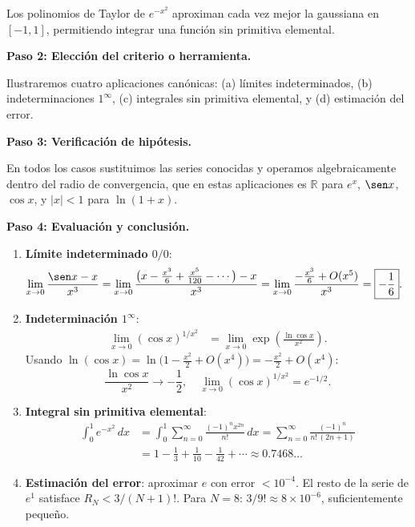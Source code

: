 \begin{example}
\begin{myproof}
Los polinomios de Taylor de $e^{-x^2}$ aproximan cada vez mejor la
gaussiana en $[-1,1]$, permitiendo integrar una función sin primitiva
elemental.

\textbf{Paso 2: Elección del criterio o herramienta.}

Ilustraremos cuatro aplicaciones canónicas: (a) límites
indeterminados, (b) indeterminaciones $1^\infty$, (c) integrales sin
primitiva elemental, y (d) estimación del error.

\textbf{Paso 3: Verificación de hipótesis.}

En todos los casos sustituimos las series conocidas y operamos
algebraicamente dentro del radio de convergencia, que en estas
aplicaciones es $\mathbb{R}$ para $e^x$, $\sen x$, $\cos x$, y
$|x|<1$ para $\ln(1+x)$.

\textbf{Paso 4: Evaluación y conclusión.}

\begin{enumerate}
    \item[(a)] \textbf{Límite indeterminado $0/0$}:
    \begin{align*}
        \lim_{x \to 0} \frac{\sen x - x}{x^3}
        &= \lim_{x \to 0}
           \frac{\bigl(x - \tfrac{x^3}{6} + \tfrac{x^5}{120}
                 - \cdots\bigr) - x}{x^3}
         = \lim_{x \to 0} \frac{-\tfrac{x^3}{6} + O(x^5)}{x^3}
         = \boxed{-\frac{1}{6}}.
    \end{align*}

    \item[(b)] \textbf{Indeterminación $1^\infty$}:
    \begin{align*}
        \lim_{x \to 0}(\cos x)^{1/x^2}
        &= \lim_{x \to 0} \exp\!\left(\frac{\ln\cos x}{x^2}\right).
    \end{align*}
    Usando $\ln(\cos x) = \ln\!\bigl(1 - \tfrac{x^2}{2}+O(x^4)\bigr)
    = -\tfrac{x^2}{2} + O(x^4)$:
    \[
        \frac{\ln\cos x}{x^2} \to -\frac{1}{2},\quad
        \boxed{\lim_{x\to 0}(\cos x)^{1/x^2} = e^{-1/2}.}
    \]

    \item[(c)] \textbf{Integral sin primitiva elemental}:
    \begin{align*}
        \int_0^1 e^{-x^2}\,dx
        &= \int_0^1 \sum_{n=0}^\infty \frac{(-1)^n x^{2n}}{n!}\,dx
         = \sum_{n=0}^\infty \frac{(-1)^n}{n!\,(2n+1)}\\
        &= 1 - \frac{1}{3} + \frac{1}{10} - \frac{1}{42}
           + \cdots
         \approx \boxed{0.7468\ldots}
    \end{align*}

    \item[(d)] \textbf{Estimación del error}: aproximar $e$ con error
    $< 10^{-4}$. El resto de la serie de $e^1$ satisface
    $R_N < 3/(N+1)!$. Para $N=8$: $3/9! \approx 8\times 10^{-6}$,
    suficientemente pequeño.
\end{enumerate}
\end{myproof}
\end{example}

